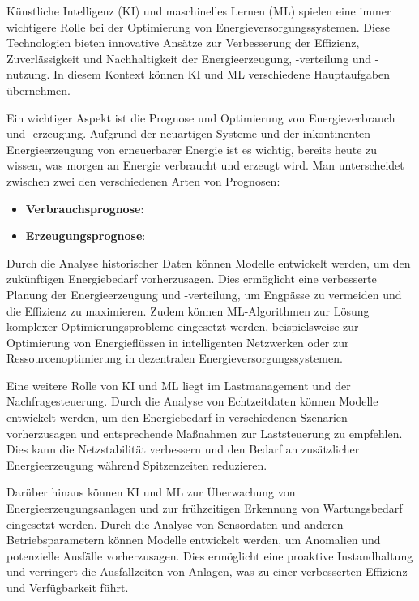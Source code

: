 Künstliche Intelligenz (KI) und maschinelles Lernen (ML) spielen eine immer
wichtigere Rolle bei der Optimierung von Energieversorgungssystemen. Diese
Technologien bieten innovative Ansätze zur Verbesserung der Effizienz,
Zuverlässigkeit und Nachhaltigkeit der Energieerzeugung, -verteilung und
-nutzung. In diesem Kontext können KI und ML verschiedene Hauptaufgaben
übernehmen.

Ein wichtiger Aspekt ist die Prognose und Optimierung von Energieverbrauch und
-erzeugung. Aufgrund der neuartigen Systeme und der inkontinenten
Energieerzeugung von erneuerbarer Energie ist es wichtig, bereits heute zu
wissen, was morgen an Energie verbraucht und erzeugt wird. 
Man unterscheidet zwischen zwei den verschiedenen Arten von Prognosen:

\begin{itemize}
    \item \textbf{Verbrauchsprognose}:
          
    \item \textbf{Erzeugungsprognose}:
          
\end{itemize}

Durch die Analyse
historischer Daten können Modelle entwickelt werden, um den zukünftigen
Energiebedarf vorherzusagen. Dies ermöglicht eine verbesserte Planung der
Energieerzeugung und -verteilung, um Engpässe zu vermeiden und die Effizienz zu
maximieren. Zudem können ML-Algorithmen zur Lösung komplexer
Optimierungsprobleme eingesetzt werden, beispielsweise zur Optimierung von
Energieflüssen in intelligenten Netzwerken oder zur Ressourcenoptimierung in
dezentralen Energieversorgungssystemen.

Eine weitere Rolle von KI und ML liegt im Lastmanagement und der
Nachfragesteuerung. Durch die Analyse von Echtzeitdaten können Modelle
entwickelt werden, um den Energiebedarf in verschiedenen Szenarien
vorherzusagen und entsprechende Maßnahmen zur Laststeuerung zu empfehlen. Dies
kann die Netzstabilität verbessern und den Bedarf an zusätzlicher
Energieerzeugung während Spitzenzeiten reduzieren.

Darüber hinaus können KI und ML zur Überwachung von Energieerzeugungsanlagen
und zur frühzeitigen Erkennung von Wartungsbedarf eingesetzt werden. Durch die
Analyse von Sensordaten und anderen Betriebsparametern können Modelle
entwickelt werden, um Anomalien und potenzielle Ausfälle vorherzusagen. Dies
ermöglicht eine proaktive Instandhaltung und verringert die Ausfallzeiten von
Anlagen, was zu einer verbesserten Effizienz und Verfügbarkeit führt.

